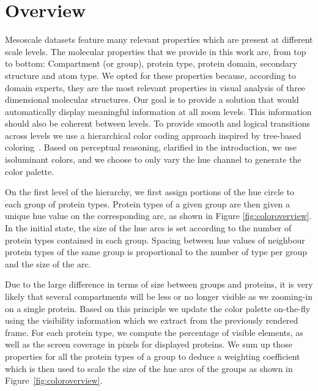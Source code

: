 \documentclass[review,journal]{vgtc}         %
\begin{document}
\section{Overview}
\label{Overview}



Mesoscale datasets feature many relevant properties which are present at different scale levels.
The molecular properties that we provide in this work are, from top to bottom: Compartment (or group), protein type, protein domain, secondary structure and atom type.
We opted for these properties because, according to domain experts, they are the most relevant properties in visual analysis of three dimensional molecular structures.
Our goal is to provide a solution that would automatically display meaningful information at all zoom levels.
This information should also be coherent between levels.
To provide smooth and logical transitions across levels we use a hierarchical color coding approach inspired by tree-based coloring~\cite{tennekes2014tree}.
Based on perceptual reasoning, clarified in the introduction, we use isoluminant colors, and we choose to only vary the hue channel to generate the color palette. 

On the first level of the hierarchy, we first assign portions of the hue circle to each group of protein types.
Protein types of a given group are then given a unique hue value on the corresponding arc, as shown in Figure \ref{fig:coloroverview}.
In the initial state, the size of the hue arcs is set according to the number of protein types contained in each group. 
Spacing between hue values of neighbour protein types of the same group is proportional to the number of type per group and the size of the arc. 

Due to the large difference in terms of size between groups and proteins, it is very likely that several compartments will be less or no longer visible as we zooming-in on a single protein. 
Based on this principle we update the color palette on-the-fly using the visibility information which we extract from the previously rendered frame.
For each protein type, we compute the percentage of visible elements, as well as the screen coverage in pixels for displayed proteins.
We sum up those properties for all the protein types of a group to deduce a weighting coefficient which is then used to scale the size of the hue arcs of the groups as shown in Figure~\ref{fig:coloroverview}.
\end{document}
